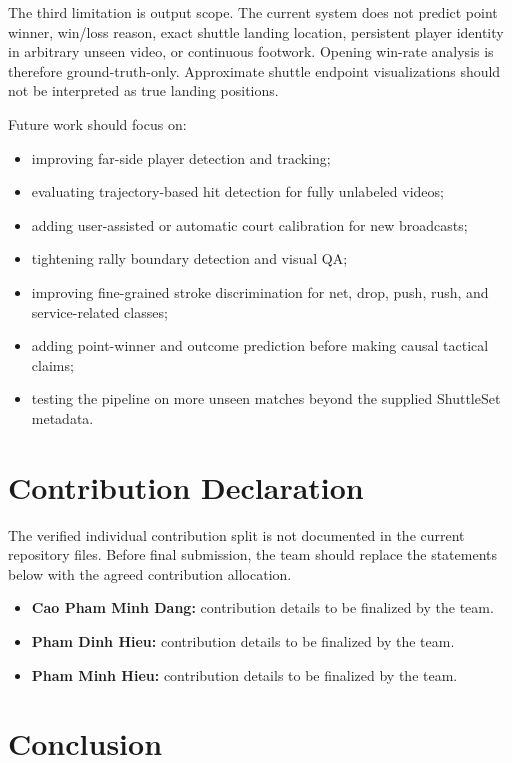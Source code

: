 \documentclass{article}
\begin{document}
The third limitation is output scope. The current system does not predict
point winner, win/loss reason, exact shuttle landing location, persistent
player identity in arbitrary unseen video, or continuous footwork. Opening
win-rate analysis is therefore ground-truth-only. Approximate shuttle endpoint
visualizations should not be interpreted as true landing positions.

Future work should focus on:
\begin{itemize}[leftmargin=*,nosep]
  \item improving far-side player detection and tracking;
  \item evaluating trajectory-based hit detection for fully unlabeled videos;
  \item adding user-assisted or automatic court calibration for new broadcasts;
  \item tightening rally boundary detection and visual QA;
  \item improving fine-grained stroke discrimination for net, drop, push,
  rush, and service-related classes;
  \item adding point-winner and outcome prediction before making causal
  tactical claims;
  \item testing the pipeline on more unseen matches beyond the supplied
  ShuttleSet metadata.
\end{itemize}

\section{Contribution Declaration}

The verified individual contribution split is not documented in the current
repository files. Before final submission, the team should replace the
statements below with the agreed contribution allocation.

\begin{itemize}[leftmargin=*]
  \item \textbf{Cao Pham Minh Dang:} contribution details to be finalized by
  the team.
  \item \textbf{Pham Dinh Hieu:} contribution details to be finalized by the
  team.
  \item \textbf{Pham Minh Hieu:} contribution details to be finalized by the
  team.
\end{itemize}

\section{Conclusion}
\end{document}

